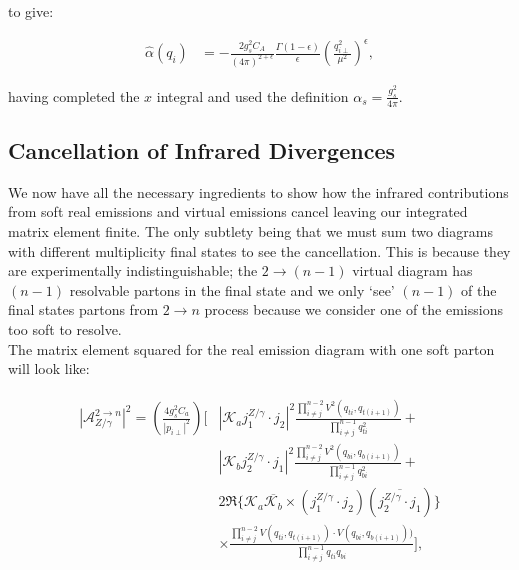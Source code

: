 		to give:

		\begin{align}
			\hat{\alpha}(q_i) &= -\frac{2g_s^2C_A}{(4\pi)^{2+\epsilon}}\frac{\Gamma(1-\epsilon)}{\epsilon}
			\left(\frac{q_{i\perp}^2}{\mu^2}\right)^\epsilon,
		\end{align}

		having completed the $x$ integral and used the definition $\alpha_s=\frac{g_s^2}{4\pi}$.

	\subsection{Cancellation of Infrared Divergences}
		\label{sub:cancellation}

		We now have all the necessary ingredients to show how the infrared contributions from
		soft real emissions and virtual emissions cancel leaving our integrated matrix element
		finite.  The only subtlety being that we must sum two diagrams with different multiplicity
		final states to see the cancellation.  This is because they are experimentally indistinguishable;
		the $2\rightarrow (n-1)$ virtual diagram has $(n-1)$ resolvable partons in the final state
		and we only `see' $(n-1)$ of the final states partons from $2\rightarrow n$ process because
		we consider one of the emissions too soft to resolve.\\
		The matrix element squared for the real emission diagram with one soft parton
		will look like:

		\begin{align}
		\begin{split}
			|\mathcal{A}_{Z/\gamma}^{2\rightarrow n}|^2 = \left(\frac{4g_s^2C_a}{|p_{i\perp}|^2}\right)
				\Bigg[&\left|\mathcal{K}_a j_1^{Z/\gamma}\cdot j_2\right|^2
				\frac{\prod^{n-2}_{i\neq j}V^2(q_{ti},
				q_{t(i+1)})}{\prod^{n-1}_{i\neq j}q^2_{ti}} + \\
				&\left|\mathcal{K}_b j_2^{Z/\gamma}\cdot j_1\right|^2
				\frac{\prod^{n-2}_{i\neq j}V^2(q_{bi}, q_{b(i+1)})}{\prod^{n-1}_{i\neq j}q^2_{bi}} + \\
				&2\Re\{\mathcal{K}_a\overline{\mathcal{K}_b} \times
				(j_1^{Z/\gamma}\cdot j_2)(\overline{j_2^{Z/\gamma}\cdot j_1})\}\\
				&\times\frac{\prod^{n-2}_{i\neq j}V(q_{ti}, q_{t(i+1)})\cdot V(q_{bi}, q_{b(i+1)}))}
				{\prod^{n-1}_{i\neq j}q_{ti}q_{bi}}\Bigg],
		\end{split}
		\end{align}

